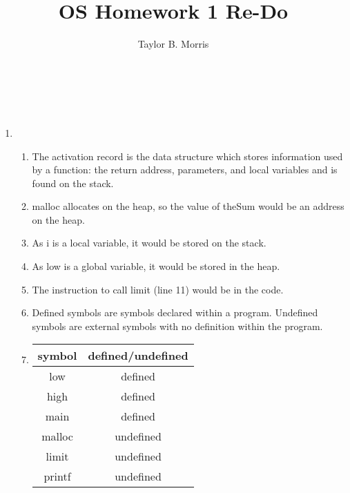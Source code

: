 \documentclass[12pt,letterpaper]{report}
\author{Taylor B. Morris}
\title{OS Homework 1 Re-Do}
\begin{document}
\makeatletter
{\huge\noindent\@title\large\\\@author\\\@date}
\makeatother
\begin{enumerate}

\item
\begin{enumerate}
\item The activation record is the data structure which stores information used by a function: the return address, parameters, and local variables and is found on the stack.
\item malloc allocates on the heap, so the value of theSum would be an address on the heap.
\item As i is a local variable, it would be stored on the stack.
\item As low is a global variable, it would be stored in the heap.
\item The instruction to call limit (line 11) would be in the code.
\item Defined symbols are symbols declared within a program. Undefined symbols are external symbols with no definition within the program.
\item \begin{tabular}{c|c}
\hline\hline
symbol & defined/undefined\\
\hline
low & defined\\
high & defined\\
main & defined\\
malloc & undefined\\
limit & undefined\\
printf & undefined\\
\hline\hline
\end{tabular}
\end{enumerate}


\end{enumerate}
\end{document}
